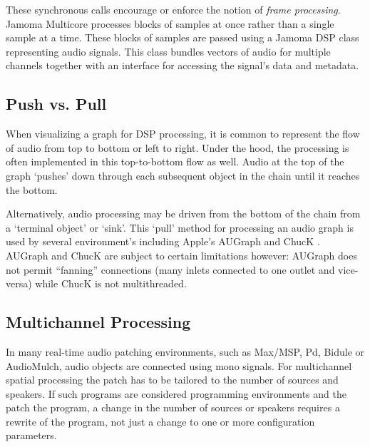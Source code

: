 \documentclass[twoside,a4paper]{article}
\begin{document}

These synchronous calls encourage or enforce the notion of \emph{frame processing}.  
Jamoma Multicore processes blocks of samples at once rather than a single sample at a time.  
These blocks of samples are passed using a Jamoma DSP class representing audio signals.  This class bundles vectors of audio for multiple channels together with an interface for accessing the signal's data and metadata.




\subsection{Push vs. Pull} \label{sec:pull} %

When visualizing a graph for DSP processing, it is common to represent the flow of audio from top to bottom or left to right.  
Under the hood, the processing is often implemented in this top-to-bottom flow as well.  
Audio at the top of the graph `pushes' down through each subsequent object in the chain until it reaches the bottom.

Alternatively, audio processing may be driven from the bottom of the chain from a `terminal object' or `sink'.  
This `pull' method for processing an audio graph is used by several environment's including Apple's AUGraph and ChucK \cite{wang:2008}. 
AUGraph and ChucK are subject to certain limitations however: AUGraph does not permit ``fanning'' connections (many inlets connected to one outlet and vice-versa) while ChucK is not multithreaded.




\subsection{Multichannel Processing} %

In many real-time audio patching environments, such as Max/MSP, Pd, Bidule or AudioMulch, audio objects are connected using mono signals. 
For multichannel spatial processing the patch has to be tailored to the number of sources and speakers. 
If such programs are considered programming environments and the patch the program, a change in the number of sources or speakers requires a rewrite of the program, not just a change to one or more configuration parameters.
\end{document}
